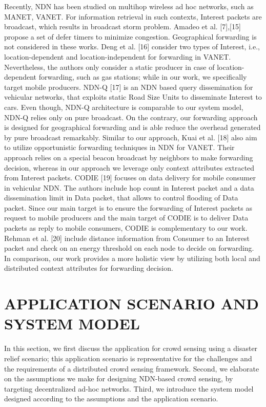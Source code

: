 \documentclass[10pt, conference, compsocconf]{IEEEtran}
\begin{document}
Recently, NDN has been studied on multihop wireless ad hoc networks, such as MANET, VANET. For information retrieval in such contexts, Interest packets are broadcast, which results in broadcast storm problem. Amadeo et al. [7],[15] propose a set of defer timers to minimize congestion. Geographical forwarding is not considered in these works. Deng et al. [16] consider two types of Interest, i.e., location-dependent and location-independent for forwarding in VANET. Nevertheless, the authors only consider a static producer in case of location-dependent forwarding, such as gas stations; while in our work, we speciﬁcally  target  mobile  producers. NDN-Q [17] is an NDN based query dissemination for vehicular networks, that exploits static Road Size Units to disseminate Interest to cars. Even though, NDN-Q architecture is comparable to our system model, NDN-Q relies only on pure broadcast. On the contrary, our forwarding approach is designed for geographical forwarding and is able reduce the overhead generated by pure broadcast remarkably. Similar to our approach, Kuai et al. [18] also aim to utilize opportunistic forwarding techniques in NDN for VANET. Their approach relies on a special beacon broadcast by neighbors to make forwarding decision, whereas in our approach we leverage only context attributes extracted from Interest packets. CODIE [19] focuses on data delivery for mobile consumer in vehicular NDN. The authors include hop count in Interest packet and a data dissemination limit in Data packet, that allows to control ﬂooding of Data packet. Since our main target is to ensure the forwarding of Interest packets as request to mobile producers and the main target of CODIE is to deliver Data packets as reply to mobile consumers, CODIE is complementary to our work. Rehman et al. [20] include distance information from Consumer to an Interest packet and check on an energy threshold on each node to decide on forwarding. In comparison, our work provides a more holistic view by utilizing both local and distributed context attributes for forwarding decision.

\section{APPLICATION SCENARIO AND SYSTEM MODEL}

In this section, we ﬁrst discuss the application for crowd sensing using a disaster relief scenario; this application scenario is representative for the challenges and the requirements of a distributed crowd sensing framework. Second, we elaborate on the assumptions we make for designing NDN-based crowd sensing, by targeting decentralized ad-hoc networks. Third, we introduce the system model designed according to the assumptions and the application scenario.
\end{document}
